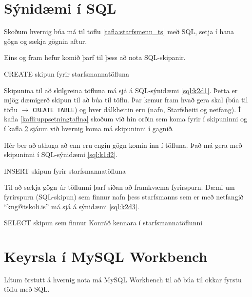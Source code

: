 \section{Sýnidæmi í SQL}
\label{undirkafli:synidaemi_i_sql}
Skoðum hvernig búa má til töflu \ref{tafla:starfsmenn_ts} með SQL, setja í hana gögn og sækja gögnin aftur. 

Eins og fram hefur komið þarf til þess að nota SQL-skipanir.

\begin{example}[h]
\caption{CREATE skipun fyrir starfsmannatöfluna}
\label{sql:k2d1}
\centering
{}
\end{example}

Skipunina til að skilgreina töfluna má sjá á SQL-sýnidæmi \ref{sql:k2d1}. Þetta er mjög dæmigerð skipun til að búa til töflu. Þar kemur fram hvað gera skal (búa til töflu $\rightarrow$ \verb|CREATE TABLE|) og hver dálkheitin eru (nafn, Starfsheiti og netfang). Í kafla \ref{kafli:uppsetningtaflna} skoðum við hin orðin sem koma fyrir í skipuninni og í kafla \ref{undirkafli:keyrslaiworkbench} sjáum við hvernig koma má skipuninni í gagnið.

Hér ber að athuga að enn eru engin gögn komin inn í töfluna. Það má gera með skipuninni í SQL-sýnidæmi \ref{sql:k1d2}.

\begin{example}[h]
\caption{INSERT skipun fyrir starfsmannatöfluna}
\label{sql:k2d2}
\centering
{\small
{}
}
\end{example}

Til að sækja gögn úr töflunni þarf síðan að framkvæma fyrirspurn. Dæmi um fyrirspurn (SQL-skipun) sem finnur nafn þess starfsmanns sem er með netfangið ``kng@tskoli.is'' má sjá á sýnidæmi \ref{sql:k2d3}.

\begin{example}[h]
\caption{SELECT skipun sem finnur Konráð kennara í starfsmannatöflunni}
\label{sql:k2d3}
\centering
{}
\end{example}

\section{Keyrsla í MySQL Workbench}
\label{undirkafli:keyrslaiworkbench}
Lítum örstutt á hvernig nota má MySQL Workbench til að búa til okkar fyrstu töflu með SQL.

